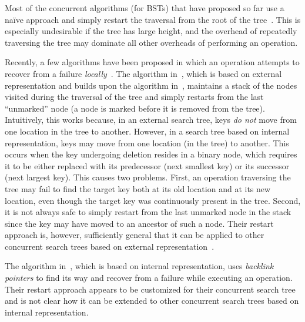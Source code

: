 Most of the concurrent algorithms (for BSTs) that have proposed so far use a na{\"i}ve approach and simply restart the traversal from the root of the tree~\cite{EllFat+:2010:PODC,HowJon:2012:SPAA,NatMit:2014:PPoPP,DraVec+:2014:PPoPP,ArbAtt:2014:PODC}. This is especially undesirable if the tree has large height, and the overhead of repeatedly traversing the tree may dominate all other overheads of performing an operation.

Recently, a few algorithms have been proposed in which an operation attempts to recover from a failure \emph{locally}~\cite{EllFat+:2014:PODC,ChaDan+:2014:PODC}. The algorithm in~\cite{EllFat+:2014:PODC}, which is based on external representation and builds upon the algorithm in~\cite{EllFat+:2010:PODC}, maintains a stack of the nodes visited during the traversal of the tree and simply restarts from the last ``unmarked'' node  (a node is marked before it is removed from the tree). Intuitively, this works because, in an external search tree, keys \emph{do not} move from one location in the tree to another. However, in a search tree based on internal representation, keys may move from one location (in the tree) to another. This occurs when the key undergoing deletion resides in a binary node, which requires it to be either replaced with its predecessor (next smallest key) or its successor (next largest key). This causes two problems. First, an operation traversing the tree may fail to find the target key both at its old location and at its new location, even though the target key was continuously present in the tree. Second, it is not always safe to simply restart from the last unmarked node in the stack since the key may have moved to an ancestor of such a node. Their restart approach is, however, sufficiently general that it can be applied to other concurrent search trees based on external representation~\cite{NatMit:2014:PPoPP}.

The algorithm in~\cite{ChaDan+:2014:PODC},  which is based on internal representation, uses \emph{backlink pointers} to find its way and recover from a failure while executing an operation. Their restart approach appears to be customized for their concurrent search tree and is not clear how it can be extended to other concurrent search trees based on internal representation.

